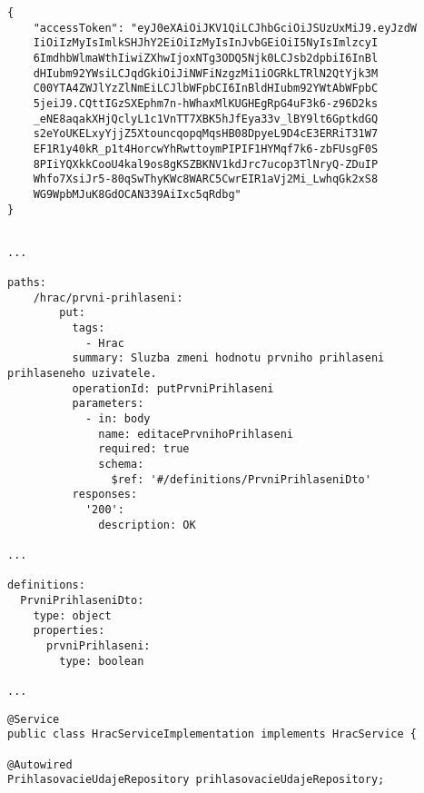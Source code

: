 \documentclass[twoside, 12pt]{article}
\begin{document}
{{\vspace{10}


\begin{lstlisting}
{
    "accessToken": "eyJ0eXAiOiJKV1QiLCJhbGciOiJSUzUxMiJ9.eyJzdW
    IiOiIzMyIsImlkSHJhY2EiOiIzMyIsInJvbGEiOiI5NyIsImlzcyI
    6ImdhbWlmaWthIiwiZXhwIjoxNTg3ODQ5Njk0LCJsb2dpbiI6InBl
    dHIubm92YWsiLCJqdGkiOiJiNWFiNzgzMi1iOGRkLTRlN2QtYjk3M
    C00YTA4ZWJlYzZlNmEiLCJlbWFpbCI6InBldHIubm92YWtAbWFpbC
    5jeiJ9.CQttIGzSXEphm7n-hWhaxMlKUGHEgRpG4uF3k6-z96D2ks
    _eNE8aqakXHjQclyL1c1VnTT7XBK5hJfEya33v_lBY9lt6GptkdGQ
    s2eYoUKELxyYjjZ5XtouncqopqMqsHB08DpyeL9D4cE3ERRiT31W7
    EF1R1y40kR_p1t4HorcwYhRwttoymPIPIF1HYMqf7k6-zbFUsgF0S
    8PIiYQXkkCooU4kal9os8gKSZBKNV1kdJrc7ucop3TlNryQ-ZDuIP
    Whfo7XsiJr5-80qSwThyKWc8WARC5CwrEIR1aVj2Mi_LwhqGk2xS8
    WG9WpbMJuK8GdOCAN339AiIxc5qRdbg"
}
\end{lstlisting}



\begin{lstlisting}

...

paths:
    /hrac/prvni-prihlaseni:
        put:
          tags:
            - Hrac
          summary: Sluzba zmeni hodnotu prvniho prihlaseni prihlaseneho uzivatele.
          operationId: putPrvniPrihlaseni
          parameters:
            - in: body
              name: editacePrvnihoPrihlaseni
              required: true
              schema:
                $ref: '#/definitions/PrvniPrihlaseniDto'
          responses:
            '200':
              description: OK

...

definitions:
  PrvniPrihlaseniDto:
    type: object
    properties:
      prvniPrihlaseni:
        type: boolean

...

\end{lstlisting}

\clearpage


\begin{lstlisting}
@Service
public class HracServiceImplementation implements HracService {

@Autowired
PrihlasovacieUdajeRepository prihlasovacieUdajeRepository;


\end{lstlisting}}}
\end{document}

